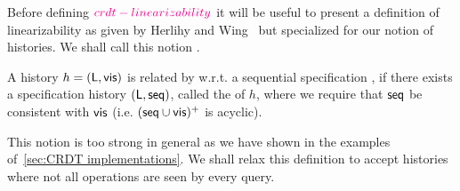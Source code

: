 Before defining ${\color{magenta} crdt-linearizability}{}$ it will be useful to present a definition
of linearizability as given by Herlihy and Wing~\cite{HerlihyW90} but
specialized for our notion of histories.
We shall call this notion \HWLin{}.

\begin{definition}[\HWLin{}]
  A history $h = (\mathsf{L},\mathsf{vis})$ is related by \HWLin{}
  w.r.t.
  a sequential specification \Spec{}, if there exists a specification
  history $(\mathsf{L}, \mathsf{seq})$,
  called the \hwlinearization{} of $h$, where we require that $\mathsf{seq}$ be
  consistent with $\mathsf{vis}$ (i.e.
  $(\mathsf{seq} \cup \mathsf{vis})^+$ is acyclic).
\end{definition}

This notion is too strong in general as we have shown in the examples
of~\autoref{sec:CRDT implementations}.
We shall relax this definition to accept histories where
not all operations are seen by every query.

